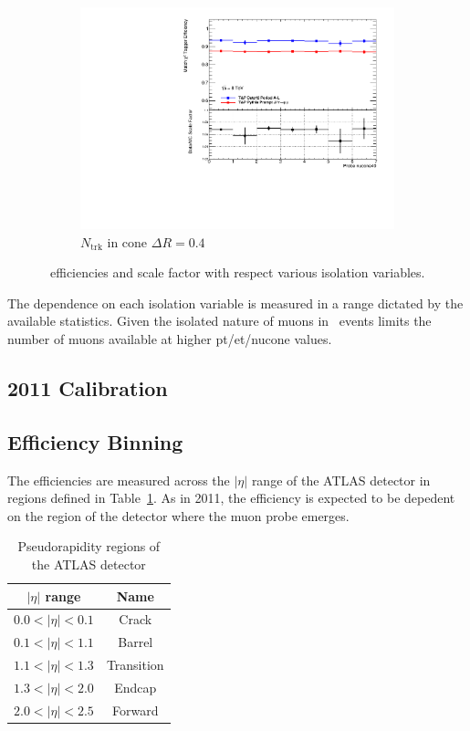 \begin{figure}[phtb]
\begin{subfigure}[b]{0.31\textwidth}
      \includegraphics[width=\textwidth]{PartCalibration2012/Plots/SFPlots/nucone40_smt.pdf}
      \caption{$N_{\textrm{trk}}$ in cone $\Delta R=0.4$} \label{fig:Alleffsfnucone40}
    \end{subfigure}
  \caption{\xsd\ efficiencies and scale factor with respect various isolation variables.} \label{fig:Calibration2011Iso}
\end{figure}

The dependence on each isolation variable is measured in a range dictated by the available statistics. Given the isolated nature of muons in \jpsi\ events limits the number of muons available at higher pt/et/nucone values.

\subsection{2011 Calibration}


\subsection{Efficiency Binning}

The efficiencies are measured across the $|\eta|$ range of the ATLAS detector in regions defined in Table~\ref{tab:CalibrationEtaRegions}. As in 2011, the efficiency is expected to be depedent on the region of the detector where the muon probe emerges.

\begin{table}[thbp]
  \centering
  \caption{Pseudorapidity regions of the ATLAS detector} \label{tab:CalibrationEtaRegions}
  \begin{tabular}{|c|c|}
    \hline 
    $|\eta|$ range & Name \\ \hline \hline
    $0.0<|\eta|<0.1$ & Crack \\
    $0.1<|\eta|<1.1$ & Barrel \\
    $1.1<|\eta|<1.3$ & Transition \\
    $1.3<|\eta|<2.0$ & Endcap \\
    $2.0<|\eta|<2.5$ & Forward \\
    \hline
  \end{tabular}
\end{table}

